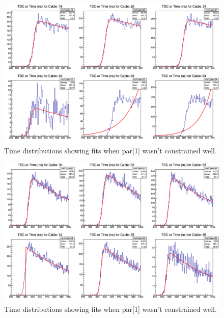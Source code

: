 \documentclass[12pt,epsfig]{article}
\begin{document}
\begin{figure}
    \centering
    \includegraphics[width=1.0\textwidth]{Figures/tdcForRun085_Cables19to24.png}
    \caption{Time distributions showing fits when par[1] wasn't constrained well.}
    \label{tdcPosExp}
\end{figure}

\begin{figure}
    \centering
    \includegraphics[width=1.0\textwidth]{Figures/tdcForRun068_Cables31to36.png}
    \caption{Time distributions showing fits when par[1] wasn't constrained well.}
    \label{tdcSharp}
\end{figure}
\end{document}
